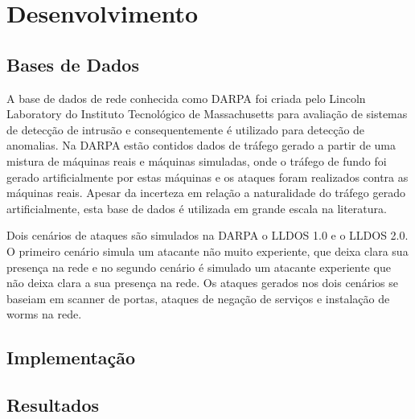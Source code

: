 \chapter{Desenvolvimento}

  \section{Bases de Dados}
\indent A base de dados de rede conhecida como DARPA foi criada pelo Lincoln Laboratory do Instituto Tecnológico de Massachusetts para avaliação de sistemas de detecção de intrusão e consequentemente é utilizado para detecção de anomalias. Na DARPA estão contidos dados de tráfego gerado a partir de uma mistura de máquinas reais e máquinas simuladas, onde o tráfego de fundo foi gerado artificialmente por estas máquinas e os ataques foram realizados contra as máquinas reais. Apesar da incerteza em relação a naturalidade do tráfego gerado artificialmente, esta base de dados é utilizada em grande escala na literatura.

\indent Dois cenários de ataques são simulados na DARPA o LLDOS 1.0 e o LLDOS 2.0. O primeiro cenário simula um atacante não muito experiente, que deixa clara sua presença na rede e no segundo cenário é simulado um atacante experiente que não deixa clara a sua presença na rede. Os ataques gerados nos dois cenários se baseiam em scanner de portas, ataques de negação de serviços e instalação de worms na rede.



  \section{Implementação}

  \section{Resultados}
